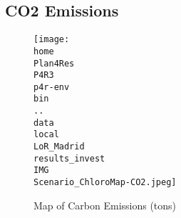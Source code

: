 \documentclass[10pt]{report}
\begin{document}
\subsection{CO2 Emissions}
\begin{figure}[H]
\centering
\texttt{[image: \\home\\Plan4Res\\P4R3\\p4r-env\\bin\\..\\data\\local\\LoR\_Madrid\\results\_invest\\IMG\\Scenario\_ChloroMap-CO2.jpeg]}
\caption{Map of Carbon Emissions (tons)}
\label{fig:Scenario_ChloroMap-CO2.jpeg}
\end{figure}
\end{document}
